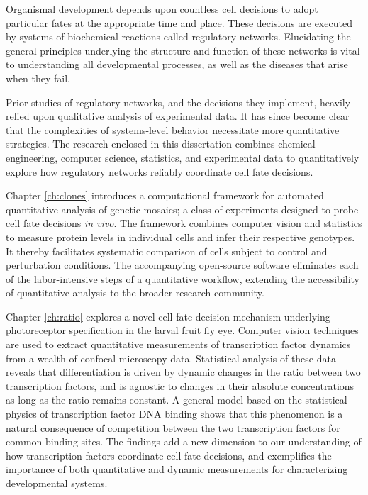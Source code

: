 Organismal development depends upon countless cell decisions to adopt particular fates at the appropriate time and place. These decisions are executed by systems of biochemical reactions called regulatory networks. Elucidating the general principles underlying the structure and function of these networks is vital to understanding all developmental processes, as well as the diseases that arise when they fail. 

Prior studies of regulatory networks, and the decisions they implement, heavily relied upon qualitative analysis of experimental data. It has since become clear that the complexities of systems-level behavior necessitate more quantitative strategies. The research enclosed in this dissertation combines chemical engineering, computer science, statistics, and experimental data to quantitatively explore how regulatory networks reliably coordinate cell fate decisions.

Chapter \ref{ch:clones} introduces a computational framework for automated quantitative analysis of genetic mosaics; a class of experiments designed to probe cell fate decisions \textit{in vivo}. The framework combines computer vision and statistics to measure protein levels in individual cells and infer their respective genotypes. It thereby facilitates systematic comparison of cells subject to control and perturbation conditions. The accompanying open-source software eliminates each of the labor-intensive steps of a quantitative workflow, extending the accessibility of quantitative analysis to the broader research community.

Chapter \ref{ch:ratio} explores a novel cell fate decision mechanism underlying photoreceptor specification in the larval fruit fly eye. Computer vision techniques are used to extract quantitative measurements of transcription factor dynamics from a wealth of confocal microscopy data. Statistical analysis of these data reveals that differentiation is driven by dynamic changes in the ratio between two transcription factors, and is agnostic to changes in their absolute concentrations as long as the ratio remains constant. A general model based on the statistical physics of transcription factor DNA binding shows that this phenomenon is a natural consequence of competition between the two transcription factors for common binding sites. The findings add a new dimension to our understanding of how transcription factors coordinate cell fate decisions, and exemplifies the importance of both quantitative and dynamic measurements for characterizing developmental systems. 

